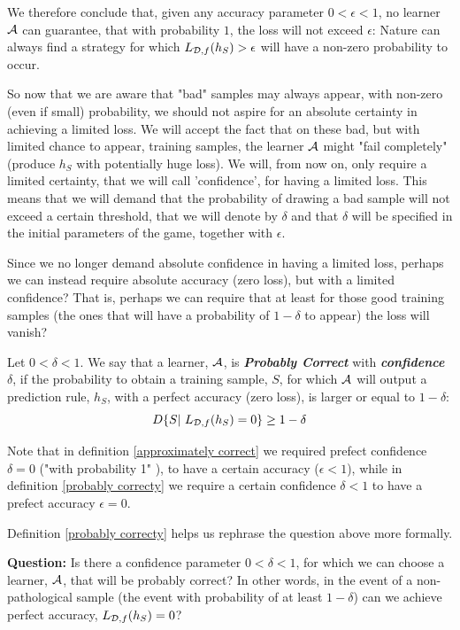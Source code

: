 {We therefore conclude that, given any accuracy parameter $0< \epsilon<1$, no learner $\mathcal{A}$ can guarantee, that with probability $1$, the loss will not exceed  $\epsilon$:  Nature can always find a strategy for which  $L_{\mathcal{D},f}(h_S) > \epsilon$ will have a non-zero probability to occur. 

So now that we are aware that "bad" samples may always appear, with non-zero (even if small) probability, we should not aspire for an absolute certainty in achieving a limited loss. We will accept the fact that on these bad, but with limited chance to appear, training samples, the learner $\mathcal{A}$ might  "fail completely"	(produce $h_S$ with potentially huge loss).  We will, from now on, only require a limited certainty, that we will call 'confidence', for having a limited loss. This means that we will demand that the probability of drawing a bad sample will not exceed a certain threshold, that we will denote by $\delta$ and that  $\delta$ will be  specified in the initial parameters of the game, together with $\epsilon$. 

Since we no longer demand absolute confidence in having a limited loss, perhaps we can instead require absolute accuracy (zero loss), but with a limited confidence? 
That is, perhaps we can require that at least for those good training samples (the ones that will have a probability of $1-\delta$ to appear) the loss will vanish? 
 

\begin{definition} \label{probably correcty}
Let $0<\delta<1$. 	We  say that a learner, $\mathcal{A}$, is \textit{\textbf{Probably Correct}} with \textit{\textbf{confidence}} $\delta$, if the probability to obtain a training sample, $S$, for which $\mathcal{A}$ will output a prediction rule, $h_S$, with a perfect accuracy (zero loss), is larger or equal to $1-\delta$:
$$D\{S|~ L_{\mathcal{D},f}(h_S)=0\}\ge 1-\delta$$
  
Note that in definition \ref{approximately correct}  we required  prefect confidence $\delta=0$ ("with probability 1" ), to have a certain accuracy ($\epsilon<1$),
while in definition \ref{probably correcty}  we require a certain confidence $\delta<1$ to have a prefect accuracy $\epsilon=0$. 
\end{definition}
Definition \ref{probably correcty} helps us rephrase the  question above more formally.
 

\textbf{Question:} Is there a confidence parameter  $0<\delta<1$,  for which we can choose a learner, $\mathcal{A}$, that will be probably correct?
In other words, in the event of a non-pathological sample (the event with probability of at least $1-\delta$) can we achieve perfect accuracy,  $L_{\mathcal{D},f}(h_S) = 0$?  

}
